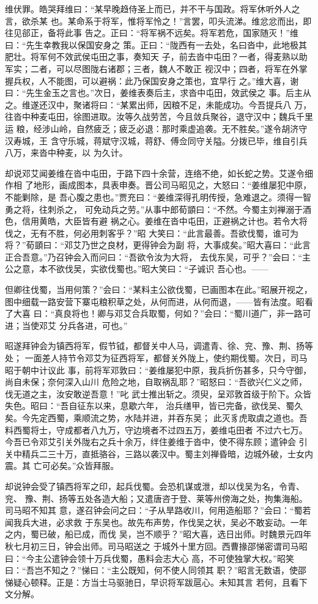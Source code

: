 维伏罪。皓哭拜维曰：“某早晚趋侍圣上而已，并不干与国政。将军休听外人之言，欲杀某
也。某命系于将军，惟将军怜之！”言罢，叩头流涕。维忿忿而出，即往见郤正，备将此事
告之。正曰：“将军祸不远矣。将军若危，国家随灭！”维曰：“先生幸教我以保国安身之
策。正曰：“陇西有一去处，名曰沓中，此地极其肥壮。将军何不效武侯屯田之事，奏知天
子，前去沓中屯田？一者，得麦熟以助军实；二者，可以尽图陇右诸郡；三者，魏人不敢正
视汉中；四者，将军在外掌握兵权，人不能图，可以避祸：此乃保国安身之策也，宜早行
之。”维大喜，谢曰：“先生金玉之言也。”次日，姜维表奏后主，求沓中屯田，效武侯之
事。后主从之。维遂还汉中，聚诸将曰：“某累出师，因粮不足，未能成功。今吾提兵八
万，往沓中种麦屯田，徐图进取。汝等久战劳苦，今且敛兵聚谷，退守汉中；魏兵千里运
粮，经涉山岭，自然疲乏；疲乏必退：那时乘虚追袭。无不胜矣。”遂令胡济守汉寿城，王
含守乐城，蒋斌守汉城，蒋舒、傅佥同守关隘。分拨已毕，维自引兵八万，来沓中种麦，以
为久计。

却说邓艾闻姜维在沓中屯田，于路下四十余营，连络不绝，如长蛇之势。艾遂令细作相
了地形，画成图本，具表申奏。晋公司马昭见之，大怒曰：“姜维屡犯中原，不能剿除，是
吾心腹之患也。”贾充曰：“姜维深得孔明传授，急难退之。须得一智勇之将，往刺杀之，
可免动兵之劳。”从事中郎荀顗曰：“不然。今蜀主刘禅溺于酒色，信用黄皓，大臣皆有避
祸之心。姜维在沓中屯田，正避祸之计也。若令大将伐之，无有不胜，何必用刺客乎？”昭
大笑曰：“此言最善。吾欲伐蜀，谁可为将？”荀顗曰：“邓艾乃世之良材，更得钟会为副
将，大事成矣。”昭大喜曰：“此言正合吾意。”乃召钟会入而问曰：“吾欲令汝为大将，
去伐东吴，可乎？”会曰：“主公之意，本不欲伐吴，实欲伐蜀也。”昭大笑曰：“子诚识
吾心也。——

但卿往伐蜀，当用何策？”会曰：“某料主公欲伐蜀，已画图本在此。”昭展开视之，
图中细载一路安营下寨屯粮积草之处，从何而进，从何而退，——皆有法度。昭看了大喜
曰：“真良将也！卿与邓艾合兵取蜀，何如？”会曰：“蜀川道广，非一路可进；当使邓艾
分兵各进，可也。”

昭遂拜钟会为镇西将军，假节钺，都督关中人马，调遣青、徐、兖、豫、荆、扬等处；
一面差人持节令邓艾为征西将军，都督关外陇上，使约期伐蜀。次日，司马昭于朝中计议此
事，前将军邓敦曰：“姜维屡犯中原，我兵折伤甚多，只今守御，尚自未保；奈何深入山川
危险之地，自取祸乱耶？”昭怒曰：“吾欲兴仁义之师，伐无道之主，汝安敢逆吾意！”叱
武士推出斩之。须臾，呈邓敦首级于阶下。众皆失色。昭曰：“吾自征东以来，息歇六年，
治兵缮甲，皆已完备，欲伐吴、蜀久矣。今先定西蜀，乘顺流之势，水陆并进，并吞东吴；
此灭豸虎取虞之道也。吾料西蜀将士，守成都者八九万，守边境者不过四五万，姜维屯田者
不过六七万。今吾已令邓艾引关外陇右之兵十余万，绊住姜维于沓中，使不得东顾；遣钟会
引关中精兵二三十万，直抵骆谷，三路以袭汉中。蜀主刘禅昏暗，边城外破，士女内震。其
亡可必矣。”众皆拜服。

却说钟会受了镇西将军之印，起兵伐蜀。会恐机谋或泄，却以伐吴为名，令青、兖、
豫、荆、扬等五处各造大船；又遣唐咨于登、莱等州傍海之处，拘集海船。司马昭不知其
意，遂召钟会问之曰：“子从旱路收川，何用造船耶？”会曰：“蜀若闻我兵大进，必求救
于东吴也。故先布声势，作伐吴之状，吴必不敢妄动。一年之内，蜀已破，船已成，而伐
吴，岂不顺乎？”昭大喜，选日出师。时魏景元四年秋七月初三日，钟会出师。司马昭送之
于城外十里方回。西曹掾邵悌密谓司马昭曰：“今主公遣钟会领十万兵伐蜀，愚料会志大心
高，不可使独掌大权。”昭笑曰：“吾岂不知之？”悌曰：“主公既知，何不使人同领其
职？”昭言无数语，使邵悌疑心顿释。正是：方当士马驱驰日，早识将军跋扈心。未知其言
若何，且看下文分解。